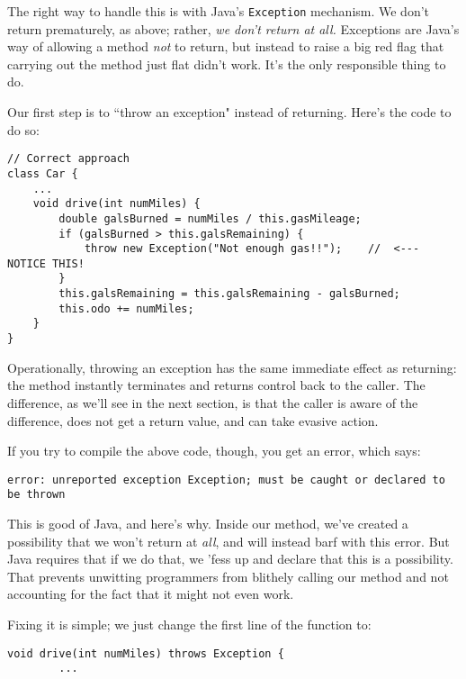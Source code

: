 The right way to handle this is with Java's \texttt{Exception} mechanism. We
don't return prematurely, as above; rather, \textit{we don't return at all.}
Exceptions are Java's way of allowing a method \textit{not} to return, but
instead to raise a big red flag that carrying out the method just flat didn't
work. It's the only responsible thing to do.

Our first step is to ``throw an exception" instead of returning. Here's the
code to do so:

\begin{Verbatim}[samepage=true,fontsize=\scriptsize,frame=single]
// Correct approach
class Car {
    ...
    void drive(int numMiles) {
        double galsBurned = numMiles / this.gasMileage;
        if (galsBurned > this.galsRemaining) {
            throw new Exception("Not enough gas!!");    //  <---  NOTICE THIS!
        }
        this.galsRemaining = this.galsRemaining - galsBurned;
        this.odo += numMiles;
    }
}
\end{Verbatim}

Operationally, throwing an exception has the same immediate effect as
returning: the method instantly terminates and returns control back to the
caller. The difference, as we'll see in the next section, is that the caller
is aware of the difference, does not get a return value, and can take evasive
action.

If you try to compile the above code, though, you get an error, which says:

\begin{Verbatim}[samepage=true,fontsize=\small]
error: unreported exception Exception; must be caught or declared to be thrown
\end{Verbatim}

This is good of Java, and here's why. Inside our method, we've created a
possibility that we won't return at \textit{all}, and will instead barf with
this error. But Java requires that if we do that, we 'fess up and declare that
this is a possibility. That prevents unwitting programmers from blithely
calling our method and not accounting for the fact that it might not even
work.

Fixing it is simple; we just change the first line of the function to:

\begin{Verbatim}[samepage=true,fontsize=\scriptsize,frame=single]
    void drive(int numMiles) throws Exception {
        ...
\end{Verbatim}

